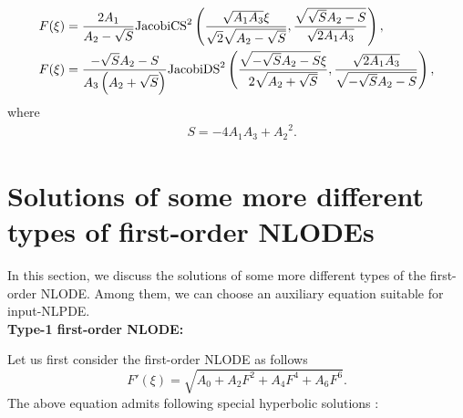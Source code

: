 \documentclass[prd,aps,floats,showkeys,nofootinbib,notitlepage]{revtex4-2}
\begin{document}
\begin{subequations}
\begin{align}
			&F(\xi)=   \frac{{2{A_1}}}{{{A_2} - \sqrt S }}{\text{JacobiC}}{{\text{S}}^2}\left( {\frac{{\sqrt {{A_1} {A_3}} \xi }}{{\sqrt 2 \sqrt {{A_2} - \sqrt S } }}, \frac{{\sqrt {\sqrt S {A_2} - S}  }}{{\sqrt {2{A_1} {A_3}} }}} \right), \hfill \\
			&F(\xi)=   \frac{{ - \sqrt S {A_2} - S}}{{{A_3}\left( {{A_2} + \sqrt S } \right)}}{\text{JacobiD}}{{\text{S}}^2}\left( {\frac{{\sqrt { - \sqrt S {A_2} - S} \xi }}{{2\sqrt {{A_2} + \sqrt S } }},\frac{{ \sqrt {2{A_1} {A_3}} }}{{\sqrt { - \sqrt S {A_2} - S} }}} \right),
		\end{align}
	\end{subequations}
	where
	\begin{align}  
		&S =  - 4 {A_1} {A_3} + {A_2}^2.
	\end{align}
	
	\renewcommand{\theequation}{D-\arabic{equation}}
	\section{Solutions of some more different types of first-order NLODEs}\label{sec:appenD}
	In this section, we discuss the solutions of some more different types of the first-order NLODE. Among them, we can choose an auxiliary equation suitable for input-NLPDE.\\ 
	\textbf{Type-1 first-order NLODE:}
	\par Let us first consider the first-order NLODE as follows 
	\begin{equation}\label{0246}
		F'(\xi ) = \sqrt{{A_0} + {A_2}{F^2} + {A_4}{F^4} + {A_6}{F^6}}.
	\end{equation}
	The above equation admits following special hyperbolic solutions \cite{0246}:
	
\end{document}
